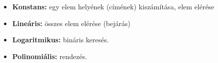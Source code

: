 \documentclass[11pt,a4paper]{article}
\begin{document}
            \begin{tcolorbox}[colback=blue!5!white,colframe=blue!50!black,title= 53. Ismertesse a tömbök használatánál előforduló komplexitás-típusokat! Mondjon példát arra a műveletre{,} amelyik adott komplexitású!]
                \begin{itemize}
                    \item \textbf{Konstans:} egy elem helyének (címének) kiszámítása, elem elérése
                    \item \textbf{Lineáris:} összes elem elérése (bejárás)
                    \item \textbf{Logaritmikus:} bináris keresés.
                    \item \textbf{Polinomiális:} rendezés.
                \end{itemize}
            \end{tcolorbox}
\end{document}
